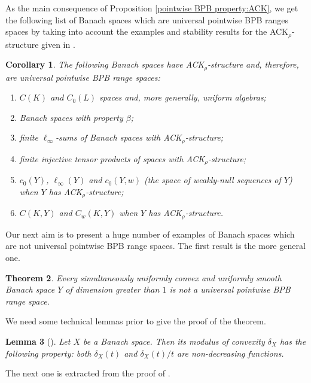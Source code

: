 \documentclass[a4paper,10pt]{amsart}
\theoremstyle{plain}
\newtheorem{theorem}{Theorem}[section]
\newtheorem{corollary}[theorem]{Corollary}
\newtheorem{lemma}[theorem]{Lemma}
\theoremstyle{definition}
\begin{document}
As the main consequence of Proposition \ref{pointwise BPB property:ACK}, we get the following list of Banach spaces which are universal pointwise BPB ranges spaces by taking into account the examples and stability results for the ACK$_\rho$-structure given in \cite[\S 4]{CGKS}.

\begin{corollary}\label{corollary-list-ACK-rho}
The following Banach spaces have ACK$_\rho$-structure and, therefore, are universal pointwise BPB range spaces:
\begin{enumerate}
\item[(a)] $C(K)$ and $C_0(L)$ spaces and, more generally, uniform algebras;
\item[(b)] Banach spaces with property $\beta$;
\item[(c)] finite $\ell_\infty$-sums of Banach spaces with ACK$_\rho$-structure;
\item[(d)] finite injective tensor products of spaces with ACK$_\rho$-structure;
\item[(e)] $c_0(Y)$, $\ell_\infty(Y)$ and $c_0(Y,w)$ (the space of weakly-null sequences of $Y$) when $Y$ has ACK$_\rho$-structure;
\item[(f)] $C(K,Y)$ and $C_w(K,Y)$ when $Y$ has ACK$_\rho$-structure.
\end{enumerate}
\end{corollary}

Our next aim is to present a huge number of examples of Banach spaces which are not universal pointwise BPB range spaces. The first result is the more general one.

\begin{theorem}\label{theorem-conv-smooth-not-universal-range}
Every simultaneously uniformly convex and uniformly smooth Banach space $Y$ of dimension greater than  $1$ is not a universal pointwise BPB range space.
\end{theorem}

We need some technical lemmas prior to give the proof of the theorem.

\begin{lemma}[{\cite[Proposition 3 and Corollary 5]{Fig76}}] \label{lemma-modulus-properties}
Let $X$ be a Banach space. Then its modulus of convexity $\delta_X$ has the following property:  both $\delta_X(t)$ and  $\delta_X(t)/t$ are non-decreasing functions.
\end{lemma}

The next one is extracted from the proof of \cite[Theorem 1]{Gur65}.
\end{document}
